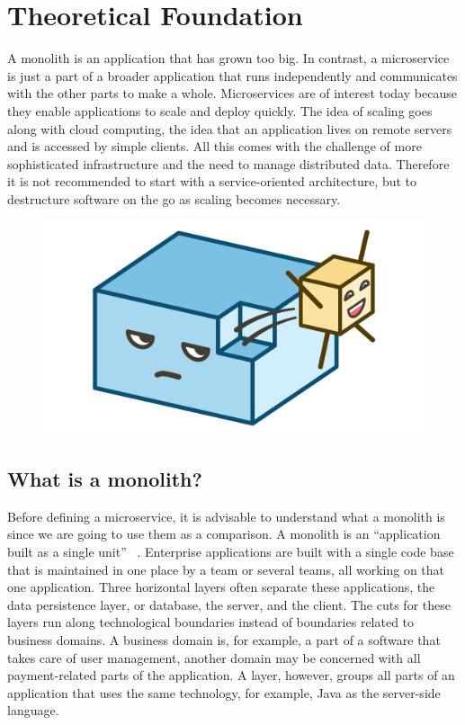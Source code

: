 \chapter{Theoretical Foundation}
\label{sec:theory}

A monolith is an application that has grown too big. In contrast, a microservice is just a part of a broader application that runs independently and communicates with the other parts to make a whole. Microservices are of interest today because they enable applications to scale and deploy quickly. The idea of scaling goes along with cloud computing, the idea that an application lives on remote servers and is accessed by simple clients. All this comes with the challenge of more sophisticated infrastructure and the need to manage distributed data. Therefore it is not recommended to start with a service-oriented architecture, but to destructure software on the go as scaling becomes necessary.

\begin{figure}[ht]
  \centering
  \includegraphics[width=0.4\linewidth]{assets/illustration-monolith-microservice.png}
  \label{fig:illustration-monolith-microservice}
\end{figure}


\section{What is a monolith?}

Before defining a microservice, it is advisable to understand what a monolith is since we are going to use them as a comparison. A monolith is an ``application built as a single unit'' ~\cite{microservices.2014}. Enterprise applications are built with a single code base that is maintained in one place by a team or several teams, all working on that one application. Three horizontal layers often separate these applications, the data persistence layer, or database, the server, and the client. The cuts for these layers run along technological boundaries instead of boundaries related to business domains. A business domain is, for example, a part of a software that takes care of user management, another domain may be concerned with all payment-related parts of the application. A layer, however, groups all parts of an application that uses the same technology, for example, Java as the server-side language.


